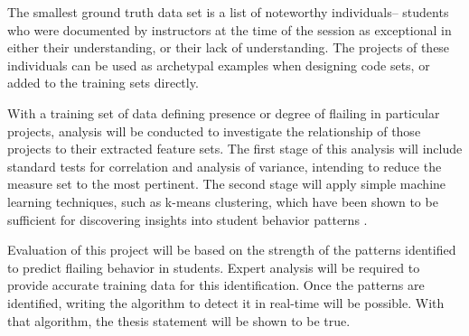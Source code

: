 The smallest ground truth data set is a list of noteworthy individuals-- students who were documented by instructors at the time of the session as exceptional in either their understanding, or their lack of understanding. The projects of these individuals can be used as archetypal examples when designing code sets, or added to the training sets directly.

With a training set of data defining presence or degree of flailing in particular projects, analysis will be conducted to investigate the relationship of those projects to their extracted feature sets. The first stage of this analysis will include standard tests for correlation and analysis of variance, intending to reduce the measure set to the most pertinent. The second stage will apply simple machine learning techniques, such as k-means clustering, which have been shown to be sufficient for discovering insights into student behavior patterns \citep{blikstein2014}.

Evaluation of this project will be based on the strength of the patterns identified to predict flailing behavior in students. Expert analysis will be required to provide accurate training data for this identification. Once the patterns are identified, writing the algorithm to detect it in real-time will be possible. With that algorithm, the thesis statement will be shown to be true.

